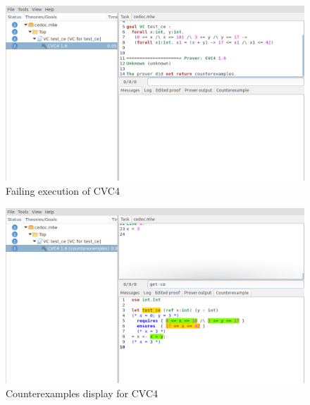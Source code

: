 



\begin{figure}[tbp]
  \includegraphics[width=\textwidth]{images/ce_example0_p1.png}
  \caption{Failing execution of CVC4} %
  \label{fig:ce_example0_p1}
\end{figure}

\begin{figure}[tbp]
  \includegraphics[width=\textwidth]{images/ce_example0_p2.png}
  \caption{Counterexamples display for CVC4} %
  \label{fig:ce_example0_p2}
\end{figure}


